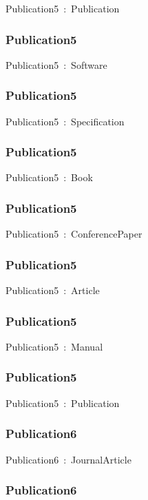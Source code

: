 \documentclass{article}
\begin{document}
Publication5~:~Publication

\subsubsection*{Publication5}

Publication5~:~Software

\subsubsection*{Publication5}

Publication5~:~Specification

\subsubsection*{Publication5}

Publication5~:~Book

\subsubsection*{Publication5}

Publication5~:~ConferencePaper

\subsubsection*{Publication5}

Publication5~:~Article

\subsubsection*{Publication5}

Publication5~:~Manual

\subsubsection*{Publication5}

Publication5~:~Publication

\subsubsection*{Publication6}

Publication6~:~JournalArticle

\subsubsection*{Publication6}
\end{document}
